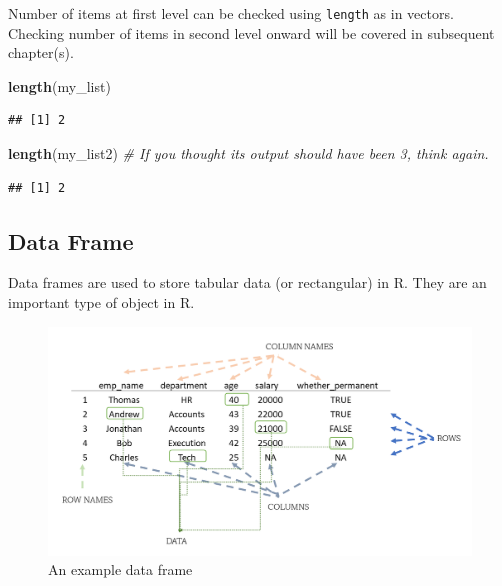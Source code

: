 \documentclass[
]{book}
\newenvironment{Shaded}{\begin{snugshade}}{\end{snugshade}}
\newcommand{\CommentTok}[1]{\textcolor[rgb]{0.56,0.35,0.01}{\textit{#1}}}
\newcommand{\FunctionTok}[1]{\textcolor[rgb]{0.13,0.29,0.53}{\textbf{#1}}}
\newcommand{\NormalTok}[1]{#1}
\begin{document}
Number of items at first level can be checked using \texttt{length} as in vectors. Checking number of items in second level onward will be covered in subsequent chapter(s).

\begin{Shaded}
\begin{Highlighting}[]
\FunctionTok{length}\NormalTok{(my\_list)}
\end{Highlighting}
\end{Shaded}

\begin{verbatim}
## [1] 2
\end{verbatim}

\begin{Shaded}
\begin{Highlighting}[]
\FunctionTok{length}\NormalTok{(my\_list2) }\CommentTok{\# If you thought its output should have been 3, think again.}
\end{Highlighting}
\end{Shaded}

\begin{verbatim}
## [1] 2
\end{verbatim}

\hypertarget{data-frame}{%
\subsection{Data Frame}\label{data-frame}}

Data frames are used to store tabular data (or rectangular) in R. They are an important type of object in R.

\begin{figure}

{\centering \includegraphics[width=0.99\linewidth]{images/dataframe} 

}

\caption{An example data frame}\label{fig:dframe}
\end{figure}
\end{document}
